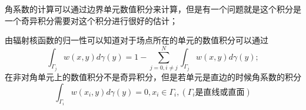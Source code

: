 角系数的计算可以通过边界单元数值积分来计算，但是有一个问题就是这个积分是一个奇异积分需要对这个积分进行很好的估计；

由辐射核函数的归一性可以知道对于场点所在的单元的数值积分可以通过
\begin{equation}
	\int_{\Gamma_j}w(x,y) d\gamma(y) = 1 - \sum_{j=0,i \ne j}^N \int_{\Gamma_j}w(x,y) d\gamma(y);
\end{equation}
在非对角单元上的数值积分不是奇异积分，但是若单元是直边的时候角系数的积分
\begin{equation}
	\int_{\Gamma_i}w(x_i,y) d \gamma(y) = 0, x_i \in \Gamma_i , (\Gamma_i \text{是直线或直面}) 
\end{equation}
\newpage
\putbib[20131020oldnotes]
\newpage
	
